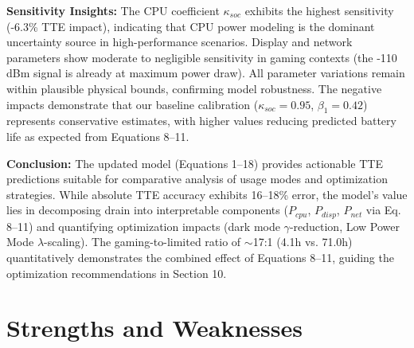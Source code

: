 \documentclass[12pt]{article}
\begin{document}
\textbf{Sensitivity Insights:} The CPU coefficient $\kappa_{soc}$ exhibits the highest sensitivity (-6.3\% TTE impact), indicating that CPU power modeling is the dominant uncertainty source in high-performance scenarios. Display and network parameters show moderate to negligible sensitivity in gaming contexts (the -110 dBm signal is already at maximum power draw). All parameter variations remain within plausible physical bounds, confirming model robustness. The negative impacts demonstrate that our baseline calibration ($\kappa_{soc} = 0.95$, $\beta_1 = 0.42$) represents conservative estimates, with higher values reducing predicted battery life as expected from Equations 8--11.


\textbf{Conclusion:} The updated model (Equations 1--18) provides actionable TTE predictions suitable for comparative analysis of usage modes and optimization strategies. While absolute TTE accuracy exhibits 16--18\% error, the model's value lies in decomposing drain into interpretable components ($P_{cpu}$, $P_{disp}$, $P_{net}$ via Eq. 8--11) and quantifying optimization impacts (dark mode $\gamma$-reduction, Low Power Mode $\lambda$-scaling). The gaming-to-limited ratio of $\sim$17:1 (4.1h vs. 71.0h) quantitatively demonstrates the combined effect of Equations 8--11, guiding the optimization recommendations in Section 10.



\section{Strengths and Weaknesses}
\end{document}
